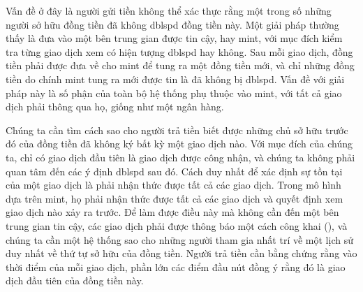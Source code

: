 \documentclass{scrartcl}
\begin{document}
\begin{center}
\end{center}

Vấn đề ở đây là người gửi tiền không thể xác thực rằng một trong số những người sở hữu đồng tiền đã không \gls{dblspd} đồng tiền này.
Một giải pháp thường thấy là đưa vào một bên trung gian được tin cậy, hay \gls{mint}, với mục đích kiểm tra từng giao dịch xem có hiện tượng \gls{dblspd} hay không.
Sau mỗi giao dịch, đồng tiền phải được đưa về cho \gls{mint} để tung ra một đồng tiền mới, và chỉ những đồng tiền do chính \gls{mint} tung ra mới được tin là đã không bị \gls{dblspd}.
Vấn đề với giải pháp này là số phận của toàn bộ hệ thống phụ thuộc vào \gls{mint}, với tất cả giao dịch phải thông qua họ, giống như một ngân hàng.

Chúng ta cần tìm cách sao cho người trả tiền biết được những chủ sở hữu trước đó của đồng tiền đã không ký bất kỳ một giao dịch nào.
Với mục đích của chúng ta, chỉ có giao dịch đầu tiên là giao dịch được công nhận, và chúng ta không phải quan tâm đến các ý định \gls{dblspd} sau đó.
Cách duy nhất để xác định sự tồn tại của một giao dịch là phải nhận thức được tất cả các giao dịch.
Trong mô hình dựa trên \gls{mint}, họ phải nhận thức được tất cả các giao dịch và quyết định xem giao dịch nào xảy ra trước.
Để làm được điều này mà không cần đến một bên trung gian tin cậy, các giao dịch phải được thông báo một cách công khai (\cite{dai1998b}), và chúng ta cần một hệ thống sao cho những người tham gia nhất trí về một lịch sử duy nhất về thứ tự sở hữu của đồng tiền.
Người trả tiền cần bằng chứng rằng vào thời điểm của mỗi giao dịch, phần lớn các điểm đầu nút đồng ý rằng đó là giao dịch đầu tiên của đồng tiền này.
\end{document}
